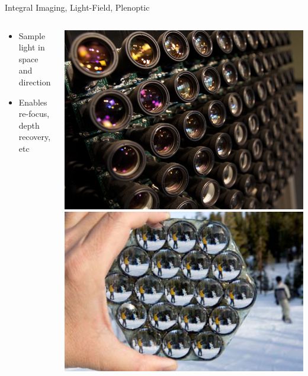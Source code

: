 \documentclass[compress,red,12pt]{beamer}
\begin{document}
 
\begin{frame}{Integral Imaging, Light-Field, Plenoptic}
  \begin{columns}[C]
    \begin{column}{.7\textwidth}
      \begin{itemize}
      \item Sample light in space and direction
      \item Enables re-focus, depth recovery, etc
      \end{itemize}
    \end{column}
    \begin{column}{.3\textwidth}
      \centering
      \includegraphics[height=0.30\textheight]{stanford_camera_array_640x480.jpg}
      \includegraphics[height=0.30\textheight]{light-field-camera.jpg}
    \end{column}
  \end{columns}
  {
  }
\end{frame}
\end{document}

